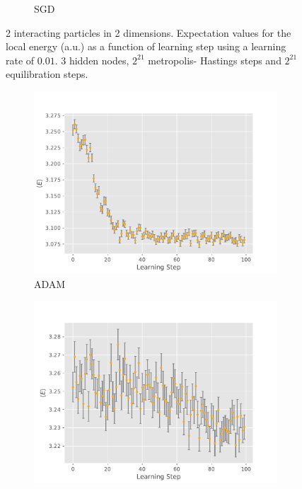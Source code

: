 \documentclass[11pt,a4paper,titlepage]{article}
\begin{document}
\begin{figure}[H]
\begin{subfigure}[t]{.5\textwidth}
\caption{SGD}
\label{SGD}
\end{subfigure}
\caption[SGD v. ADAM]{2 interacting particles in 2 dimensions. Expectation values for the local energy (a.u.) as a function of learning step using a learning rate of $0.01$. 3 hidden nodes, $2^{21}$ metropolis- Hastings steps and $2^{21}$ equilibration steps. }
\label{fig:ADAM_v_SGD}
\end{figure}

\begin{figure}[H]
\begin{subfigure}[t]{.5\textwidth}
\centering
\includegraphics[trim=0cm 0.0cm 0cm 0.0cm,scale = 0.5]{D2_P_2I_Y__S_2pow21_eqS_2pow21_GD_ls_v_E_LR_0.100000_NH_3_Adaptive_1.pdf}
\caption{ADAM}
\label{ADAM2}
\end{subfigure}
\begin{subfigure}[t]{.5\textwidth}
\centering
\includegraphics[trim=0cm 0.0cm 0cm 0.0cm,scale = 0.5]{D2_P_2I_Y__S_2pow21_eqS_2pow21_GD_ls_v_E_LR_0.100000_NH_3_Adaptive_0.pdf}

\end{subfigure}
\end{figure}
\end{document}
